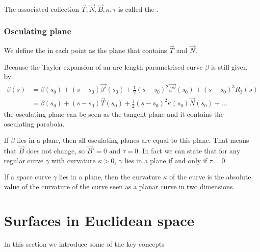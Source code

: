 The associated collection $\vec{T}, \vec{N}, \vec{B}, \kappa, \tau$ is called the .

\subsubsection{Osculating plane}
We define the  in each point as the plane that contains $\vec{T}$ and $\vec{N}$.

Because the Taylor expansion of an arc length parametrised curve $\beta$ is still given by
\begin{align*}
\beta(s) &= \beta(s_0) + (s-s_0)\vec{\beta'}(s_0) + \frac{1}{2}(s-s_0)^2\vec{\beta''}(s_0) + (s-s_0)^3R_3(s) \\
&= \beta(s_0) + (s-s_0)\vec{T}(s_0) + \frac{1}{2}(s-s_0)^2\kappa(s_0)\vec{N}(s_0) + \ldots
\end{align*}
the osculating plane can be seen as the tangent plane and it contains the osculating parabola.

If $\beta$ lies in a plane, then all osculating planes are equal to this plane. That means that $\vec{B}$ does not change, so $\vec{B}'= 0$ and $\tau = 0$. In fact we can state that for any regular curve $\gamma$ with curvature $\kappa > 0$, $\gamma$ lies in a plane if and only if $\tau = 0$.

If a space curve $\gamma$ lies in a plane, then the curvature $\kappa$ of the curve is the absolute value of the curvature of the curve seen as a planar curve in two dimensions.

\section{Surfaces in Euclidean space}
In this section we introduce some of the key concepts